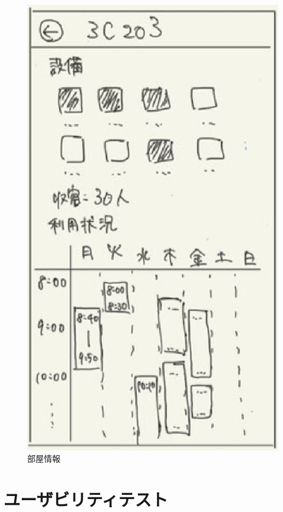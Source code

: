 \documentclass[12pt,a4paper,dvipdf]{jsarticle}
\begin{document}
\begin{figure}[H]
\begin{minipage}[b]{0.24\columnwidth}
        \includegraphics[width=0.9\columnwidth]{./img/部屋情報.png}
        \caption{部屋情報}
    \end{minipage}
\end{figure}



\newpage
\section{ユーザビリティテスト}
\end{document}
